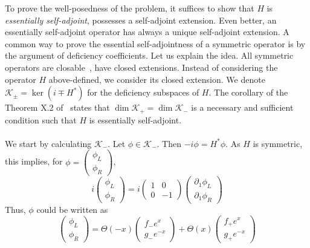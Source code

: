 To prove the well-posedness of the problem, it suffices to show that $H$ is \textit{essentially self-adjoint}, \ie possesses a self-adjoint extension.
Even better, an essentially self-adjoint operator has always a unique self-adjoint extension.
A common way to prove the essential self-adjointness of a symmetric operator is by the argument of deficiency coefficients.
Let us explain the idea.
All symmetric operators are closable~\cite{Reed1981}, 
\ie
have closed extensions.
Instead of considering the operator $H$ above-defined, 
we consider its closed extension.
We denote  $\mathcal{K}_{\pm} = \ker (i \mp H^*)$ for the deficiency subspaces of $H$. 
The corollary of the Theorem X.2 of~\cite{Reed1975} states that $\dim \mathcal{K}_+ = \dim \mathcal{K}_-$ is a necessary and sufficient condition such that $H$ is essentially self-adjoint. \\\\
We start by calculating $\mathcal{K}_-$. Let $\phi \in \mathcal{K}_-$. Then $- i \phi = H^* \phi$. As $H$ is symmetric, this implies, for $\phi = \begin{pmatrix} \phi_L \\  \phi_R \end{pmatrix}$, 
\begin{equation}
i \begin{pmatrix} \phi_L \\ \phi_R \end{pmatrix} = 
i \begin{pmatrix} 1 & 0  \\ 0  &  -1 \end{pmatrix} 
\begin{pmatrix} \partial_1 \phi_L  \\  \partial_1\phi_R \end{pmatrix}
\end{equation} 
Thus, $\phi$ could be written as
\begin{equation}
\begin{pmatrix} \phi_L \\ \phi_R \end{pmatrix} = 
\Theta(-x) \begin{pmatrix} f_- e^x  \\ g_-  e^{-x} \end{pmatrix} + 
\Theta(x) \begin{pmatrix} f_+ e^x  \\ g_+  e^{-x} \end{pmatrix}
\end{equation}
